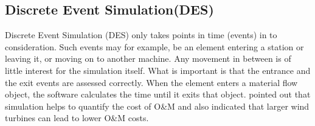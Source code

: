 \subsection{Discrete Event Simulation(DES)}
 Discrete Event Simulation (DES) only takes points in time (events) in to consideration. Such events may for example, be an element entering a station or leaving it, or moving on to another machine. Any movement in between is of little interest for the simulation itself. What is important is that the entrance and the exit events are assessed correctly. When the element enters a material flow object, the software calculates the time until it exits that object. \cite{Hofmann 2014} pointed out that simulation helps to quantify the cost of O&M and also indicated that larger wind turbines can lead to lower O&M costs. 
